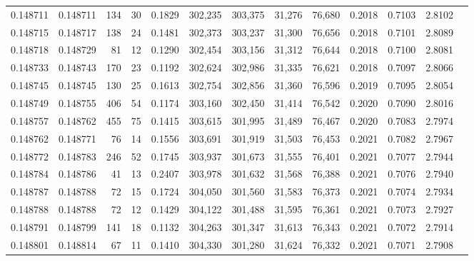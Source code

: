 \begin{tabular}{rrrrrrrrrrrrr}
0.148711 & 0.148711 &   134 &  30 &                                     0.1829 & 302,235 & 303,375 &  31,276 &  76,680 & 0.2018 & 0.7103 & 2.8102 \\
0.148715 & 0.148717 &   138 &  24 &                                     0.1481 & 302,373 & 303,237 &  31,300 &  76,656 & 0.2018 & 0.7101 & 2.8089 \\
0.148718 & 0.148729 &    81 &  12 &                                     0.1290 & 302,454 & 303,156 &  31,312 &  76,644 & 0.2018 & 0.7100 & 2.8081 \\
0.148733 & 0.148743 &   170 &  23 &                                     0.1192 & 302,624 & 302,986 &  31,335 &  76,621 & 0.2018 & 0.7097 & 2.8066 \\
0.148745 & 0.148745 &   130 &  25 &                                     0.1613 & 302,754 & 302,856 &  31,360 &  76,596 & 0.2019 & 0.7095 & 2.8054 \\
0.148749 & 0.148755 &   406 &  54 &                                     0.1174 & 303,160 & 302,450 &  31,414 &  76,542 & 0.2020 & 0.7090 & 2.8016 \\
0.148757 & 0.148762 &   455 &  75 &                                     0.1415 & 303,615 & 301,995 &  31,489 &  76,467 & 0.2020 & 0.7083 & 2.7974 \\
0.148762 & 0.148771 &    76 &  14 &                                     0.1556 & 303,691 & 301,919 &  31,503 &  76,453 & 0.2021 & 0.7082 & 2.7967 \\
0.148772 & 0.148783 &   246 &  52 &                                     0.1745 & 303,937 & 301,673 &  31,555 &  76,401 & 0.2021 & 0.7077 & 2.7944 \\
0.148784 & 0.148786 &    41 &  13 &                                     0.2407 & 303,978 & 301,632 &  31,568 &  76,388 & 0.2021 & 0.7076 & 2.7940 \\
0.148787 & 0.148788 &    72 &  15 &                                     0.1724 & 304,050 & 301,560 &  31,583 &  76,373 & 0.2021 & 0.7074 & 2.7934 \\
0.148788 & 0.148788 &    72 &  12 &                                     0.1429 & 304,122 & 301,488 &  31,595 &  76,361 & 0.2021 & 0.7073 & 2.7927 \\
0.148791 & 0.148799 &   141 &  18 &                                     0.1132 & 304,263 & 301,347 &  31,613 &  76,343 & 0.2021 & 0.7072 & 2.7914 \\
0.148801 & 0.148814 &    67 &  11 &                                     0.1410 & 304,330 & 301,280 &  31,624 &  76,332 & 0.2021 & 0.7071 & 2.7908 \\

\end{tabular}
